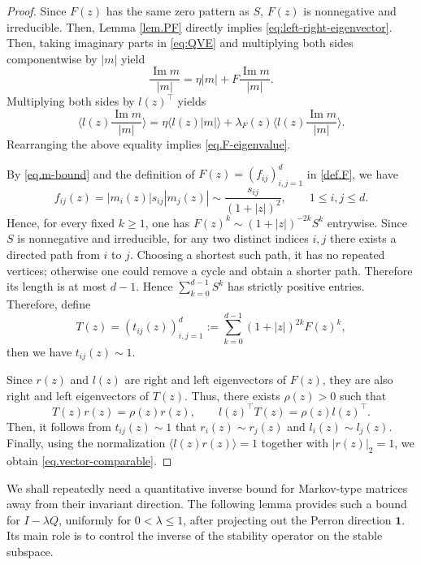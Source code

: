\documentclass[11pt,twoside, a4paper]{article}
\numberwithin{equation}{section}
\numberwithin{figure}{section}
\theoremstyle{plain} %
\theoremstyle{definition}
\theoremstyle{remark}
\newcommand{\1} {\mspace{1 mu}}
\newcommand{\2} {\mspace{2 mu}}
\DeclareMathOperator{\im}{Im}
\begin{document}
\begin{proof}
  Since \(F(z)\) has the same zero pattern as \(S\), \(F(z)\) is nonnegative and irreducible. Then, Lemma \ref{lem.PF} directly implies \eqref{eq:left-right-eigenvector}.
  Then, taking imaginary parts in \eqref{eq:QVE} and multiplying both sides componentwise by $|m|$ yield
  \begin{equation}\label{eq.take-imaginary-Multiplying}
    \frac{\im m}{|m|}=\eta|m|+F\frac{\im m}{|m|}.
  \end{equation}
  Multiplying both sides by $l(z)^\top$  yields 
  \begin{equation*}
    \langle l(z)\frac{\im m}{|m|}\rangle=\eta\langle l(z)|m|\rangle+\lambda_F(z) \langle l(z)\frac{\im m}{|m|}\rangle.
  \end{equation*}
  Rearranging the above equality implies \eqref{eq.F-eigenvalue}.


  By \eqref{eq.m-bound} and the definition of $F(z)=(f_{ij})_{i,j=1}^d$ in \eqref{def.F},  we have
  \begin{equation}\label{eq.Fij}
    f_{ij}(z)=|m_i(z)| s_{ij}|m_j(z)|\sim \frac{s_{ij}}{(1+|z|)^2},
  \qquad 1\le i,j\le d.
  \end{equation}
  Hence, for every fixed $k\ge 1$, one has
  $
  F(z)^k \sim (1+|z|)^{-2k} S^k
  $
  entrywise.
  Since $S$ is nonnegative and irreducible, 
  for any two distinct indices \(i,j\) there exists a directed path from \(i\) to \(j\). Choosing a shortest such path, it has no repeated vertices; otherwise one could remove a cycle and obtain a shorter path. Therefore its length is at most \(d-1\). 
  Hence
  $
  \sum_{k=0}^{d-1} S^k
  $
  has strictly positive entries. Therefore, define
  \[
  T(z)=(t_{ij}(z))_{i,j=1}^d:=\sum_{k=0}^{d-1} (1+|z|)^{2k} F(z)^k ,
  \]
  then we have
  $
  t_{ij}(z)\sim 1.
  $

  Since $r(z)$ and $l(z)$ are right and left eigenvectors of $F(z)$, they are also right and left eigenvectors of $T(z)$. Thus, there exists $\rho(z)>0$ such that
  \[
  T(z)r(z)=\rho(z)r(z),\qquad l(z)^\top T(z)=\rho(z)l(z)^\top.
  \]
  Then, it follows from $t_{ij}(z)\sim 1$ that $r_i(z)\sim r_j(z)$ and $l_i(z)\sim l_j(z)$.
  Finally, using the normalization $\langle l(z)r(z)\rangle=1$ together with $|r(z)|_2=1$, we obtain \eqref{eq.vector-comparable}.
\end{proof}

\bigskip


We shall repeatedly need a quantitative inverse bound for Markov-type
matrices away from their invariant direction. The following lemma provides such
a bound for \(I-\lambda Q\), uniformly for \(0<\lambda\le 1\), after projecting
out the Perron direction \(\mathbf 1\). Its main role is to control the inverse
of the stability operator on the stable subspace.
\end{document}
